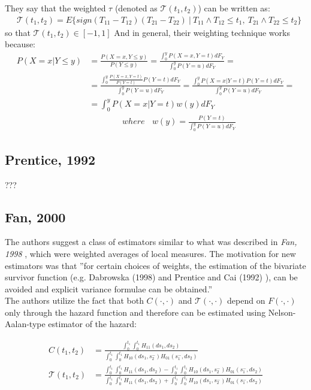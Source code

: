 \documentclass[]{article}
\begin{document}
They say that the weighted $\tau$ (denoted as $\mathcal{T}(t_1, t_2)$) can be written as:
	$$
	\begin{aligned}
		&\mathcal{T}(t_1, t_2) = E\{sign(T_{11} - T_{12}) (T_{21} - T_{22})~|~ T_{11}\wedge T_{12} \leq t_1,~T_{21}\wedge T_{22} \leq t_2  \}
	\end{aligned}
	$$
	so that $\mathcal{T}(t_1, t_2) \in [-1,1]$
And in general, their weighting technique works because:
	$$
	\begin{aligned}
		P(X=x|Y\leq y) &= \frac{P(X=x, Y\leq y)}{P(Y\leq y)} 
    =\frac{\int_0^y P(X=x, Y = t)dF_Y}{\int_0^y P(Y= u)dF_Y}  = \\
    &=\frac{\int_0^y \frac{P(X=x, Y = t)}{P(Y = t)}P(Y = t)dF_Y}{\int_0^y P(Y= u)dF_Y} =\frac{\int_0^y P(X=x | Y = t)P(Y = t)dF_Y}{\int_0^y P(Y= u)dF_Y}=\\
&=\int_0^y P(X=x | Y = t)w(y)dF_Y\\
&~~~~~~~~~~~~~~~~~~where~~~~w(y) = \frac{P(Y = t)}{\int_0^y P(Y= u)dF_Y}
	\end{aligned}
	$$


\subsection{Prentice, 1992 \cite{prentice1992covariance}}
???

\subsection{Fan, 2000 \cite{fan2000class}}
The authors suggest a class of estimators similar to what was described in \emph{Fan, 1998} \cite{fan2000dependence}, which were weighted averages of local measures. The motivation for new estimators was that ''for certain choices of weights, the estimation of the bivariate survivor function (e.g. Dabrowska (1998)\cite{dabrowska1988kaplan} and Prentice and Cai (1992) \cite{prentice1992covariance}), can be avoided and explicit variance formulae can be obtained.''\\
The authors utilize the fact that both $C(\cdot, \cdot)$ and $\mathcal{T}(\cdot, \cdot)$ depend on $F(\cdot, \cdot)$ only through the hazard function and therefore can be estimated using Nelson-Aalan-type estimator of the hazard:

	$$
	\begin{aligned}
    C(t_1, t_2) &= \frac{\int_0^{t_1}\int_0^{t_1} H_{11}(ds_1, ds_2)}{\int_0^{t_1}\int_0^{t_1} H_{10}(ds_1, s_2^-)H_{01}(s_1^-, ds_2)}\\
    \mathcal{T}(t_1, t_2) &= \frac{\int_0^{t_1}\int_0^{t_1} H_{11}(ds_1, ds_2) - \int_0^{t_1}\int_0^{t_1} H_{10}(ds_1, s_2^-)H_{01}(s_1^-, ds_2) }{\int_0^{t_1}\int_0^{t_1} H_{11}(ds_1, ds_2) + \int_0^{t_1}\int_0^{t_1} H_{10}(ds_1, s_2^-)H_{01}(s_1^-, ds_2) }\\
	\end{aligned}
	$$
\end{document}
